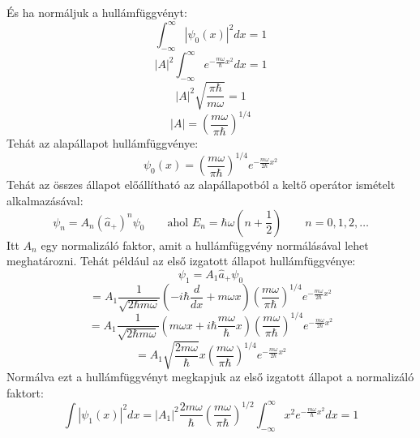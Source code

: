 \documentclass[../main.tex]{subfiles}
\begin{document}
És ha normáljuk a hullámfüggvényt:
\begin{equation}
    \int_{-\infty}^{\infty} |\psi_0(x)|^2 dx = 1
\end{equation}
\begin{equation}
    |A|^2 \int_{-\infty}^{\infty} e^{- \frac{m \omega}{\hbar} x^2} dx = 1
\end{equation}
\begin{equation}
    |A|^2 \sqrt{\frac{\pi \hbar}{m \omega}} = 1
\end{equation}
\begin{equation}
    |A| = \left( \frac{m \omega}{\pi \hbar} \right)^{1/4}
\end{equation}
Tehát az alapállapot hullámfüggvénye:
\begin{equation}
    \psi_0(x) = \left( \frac{m \omega}{\pi \hbar} \right)^{1/4} e^{- \frac{m \omega}{2 \hbar} x^2}
\end{equation}
Tehát az összes állapot előállítható az alapállapotból a keltő operátor ismételt alkalmazásával:
\begin{equation}
    \psi_n = A_n (\hat{a}_+)^n \psi_0 \quad \quad \text{ahol }  E_n = \hbar \omega \left( n + \frac{1}{2} \right) \quad \quad n = 0, 1, 2, \ldots
\end{equation}
Itt $A_n$ egy normalizáló faktor, amit a hullámfüggvény normálásával lehet meghatározni. Tehát például az első izgatott állapot hullámfüggvénye:
\begin{equation}
    \psi_1 = A_1 \hat{a}_+ \psi_0
\end{equation}
\begin{equation}
    = A_1 \frac{1}{\sqrt{2 \hbar m \omega}} \left( - i \hbar \frac{d}{dx} + m \omega x \right) \left( \frac{m \omega}{\pi \hbar} \right)^{1/4} e^{- \frac{m \omega}{2 \hbar} x^2}
\end{equation}
\begin{equation}
    = A_1 \frac{1}{\sqrt{2 \hbar m \omega}} \left( m \omega x + i \hbar \frac{m \omega}{\hbar} x \right) \left( \frac{m \omega}{\pi \hbar} \right)^{1/4} e^{- \frac{m \omega}{2 \hbar} x^2}
\end{equation}
\begin{equation}
    = A_1 \sqrt{\frac{2 m \omega}{\hbar}} x \left( \frac{m \omega}{\pi \hbar} \right)^{1/4} e^{- \frac{m \omega}{2 \hbar} x^2}
\end{equation}
Normálva ezt a hullámfüggvényt megkapjuk az első izgatott állapot a normalizáló faktort:
\begin{equation}
    \int |\psi_1(x)|^2 dx = |A_1|^2 \frac{2 m \omega}{\hbar} \left( \frac{m \omega}{\pi \hbar} \right)^{1/2} \int_{-\infty}^{\infty} x^2 e^{- \frac{m \omega}{\hbar} x^2} dx = 1
\end{equation}
\end{document}
